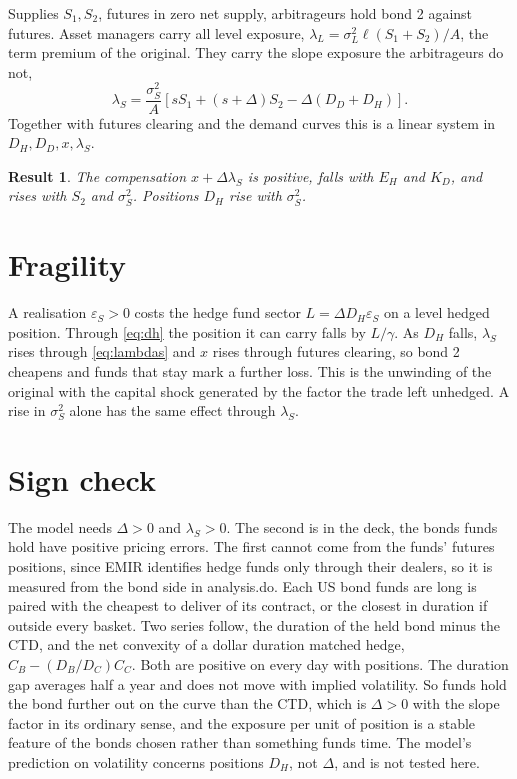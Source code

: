 \documentclass[12pt]{article}
\newtheorem{result}{Result}
\begin{document}
Supplies $S_1, S_2$, futures in zero net supply, arbitrageurs hold bond 2 against futures. Asset managers carry all level exposure, $\lambda_L = \sigma_L^2 \ell (S_1 + S_2)/A$, the term premium of the original. They carry the slope exposure the arbitrageurs do not,
\begin{equation}
\lambda_S = \frac{\sigma_S^2}{A} \left[ s S_1 + (s+\Delta) S_2 - \Delta (D_D + D_H) \right] .
\label{eq:lambdas}
\end{equation}
Together with futures clearing and the demand curves this is a linear system in $D_H, D_D, x, \lambda_S$.
\begin{result}
The compensation $x + \Delta \lambda_S$ is positive, falls with $E_H$ and $K_D$, and rises with $S_2$ and $\sigma_S^2$. Positions $D_H$ rise with $\sigma_S^2$.
\end{result}

\section{Fragility}

A realisation $\varepsilon_S > 0$ costs the hedge fund sector $L = \Delta D_H \varepsilon_S$ on a level hedged position. Through \eqref{eq:dh} the position it can carry falls by $L / \gamma$. As $D_H$ falls, $\lambda_S$ rises through \eqref{eq:lambdas} and $x$ rises through futures clearing, so bond 2 cheapens and funds that stay mark a further loss. This is the unwinding of the original with the capital shock generated by the factor the trade left unhedged. A rise in $\sigma_S^2$ alone has the same effect through $\lambda_S$.

\section{Sign check}

The model needs $\Delta > 0$ and $\lambda_S > 0$. The second is in the deck, the bonds funds hold have positive pricing errors. The first cannot come from the funds' futures positions, since EMIR identifies hedge funds only through their dealers, so it is measured from the bond side in analysis.do. Each US bond funds are long is paired with the cheapest to deliver of its contract, or the closest in duration if outside every basket. Two series follow, the duration of the held bond minus the CTD, and the net convexity of a dollar duration matched hedge, $C_B - (D_B/D_C) C_C$. Both are positive on every day with positions. The duration gap averages half a year and does not move with implied volatility. So funds hold the bond further out on the curve than the CTD, which is $\Delta > 0$ with the slope factor in its ordinary sense, and the exposure per unit of position is a stable feature of the bonds chosen rather than something funds time. The model's prediction on volatility concerns positions $D_H$, not $\Delta$, and is not tested here.
\end{document}

